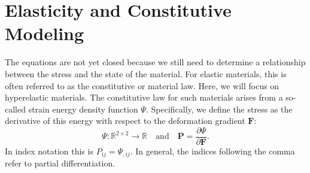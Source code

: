 \section*{Elasticity and Constitutive Modeling}

The equations are not yet closed because we still need to determine a relationship between the stress and the state of the material. For elastic materials, this is often referred to as the constitutive or material law. Here, we will focus on hyperelastic materials. The constitutive law for such materials arises from a so-called strain energy density function $\Psi$. Specifically, we define the stress as the derivative of this energy with respect to the deformation gradient $\mathbf{F}$:
\begin{equation*}
\Psi \colon \mathbb{R}^{2\times2} \to \mathbb{R} \quad \text{and} \quad \mathbf{P} = \frac{\partial\Psi}{\partial\mathbf{F}}.
\end{equation*}
In index notation this is $P_{ij} = \Psi_{,ij}$. In general, the indices following the comma refer to partial differentiation.

